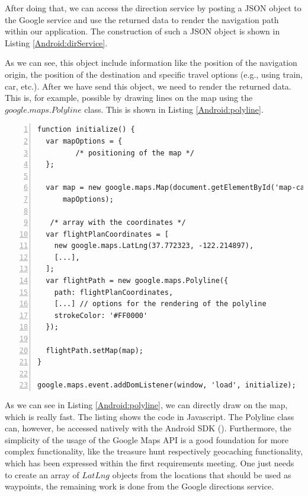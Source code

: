 After doing that, we can access the direction service by posting a \ac{JSON} object to the Google service and use the returned data to render the navigation path within our application. The construction of such a \ac{JSON} object is shown in Listing \ref{Android:dirService}. 

As we can see, this object include information like the position of the navigation origin, the position of the destination and specific travel options (e.g., using train, car, etc.). After we have send this object, we need to render the returned data. This is, for example, possible by drawing lines on the map using the $google.maps.Polyline$ class. This is shown in Listing \ref{Android:polyline}.

\begin{lstlisting}[numbers=left,caption={Example for writing a poly line on the google map},label=Android:polyline,frame=tlbr,breaklines]
function initialize() {
  var mapOptions = {
         /* positioning of the map */
  };

  var map = new google.maps.Map(document.getElementById('map-canvas'),
      mapOptions);

   /* array with the coordinates */
  var flightPlanCoordinates = [
    new google.maps.LatLng(37.772323, -122.214897),
    [...],
  ];
  var flightPath = new google.maps.Polyline({
    path: flightPlanCoordinates,
    [...] // options for the rendering of the polyline
    strokeColor: '#FF0000'
  });

  flightPath.setMap(map);
}

google.maps.event.addDomListener(window, 'load', initialize);
\end{lstlisting}

As we can see in Listing \ref{Android:polyline}, we can directly draw on the map, which is really fast. The listing shows the code in Javascript. The Polyline class can, however, be accessed natively with the Android SDK (\cite{GooglePolylineNative}). Furthermore, the simplicity of the usage of the Google Maps API is a good foundation for more complex functionality, like the treasure hunt respectively geocaching functionality, which has been expressed within the first requirements meeting. One just needs to create an array of $LatLng$ objects from the locations that should be used as waypoints, the remaining work is done from the Google directions service.  


